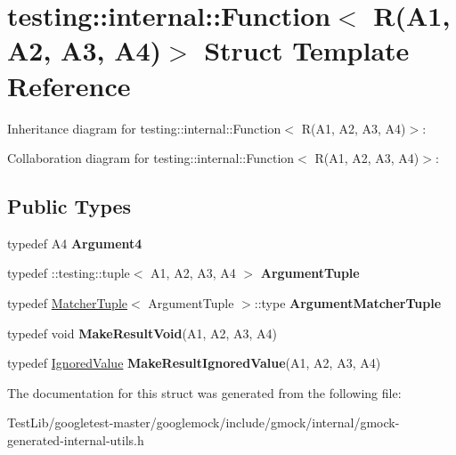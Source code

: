 \hypertarget{structtesting_1_1internal_1_1Function_3_01R_07A1_00_01A2_00_01A3_00_01A4_08_4}{}\section{testing\+:\+:internal\+:\+:Function$<$ R(A1, A2, A3, A4)$>$ Struct Template Reference}
\label{structtesting_1_1internal_1_1Function_3_01R_07A1_00_01A2_00_01A3_00_01A4_08_4}


Inheritance diagram for testing\+:\+:internal\+:\+:Function$<$ R(A1, A2, A3, A4)$>$\+:


Collaboration diagram for testing\+:\+:internal\+:\+:Function$<$ R(A1, A2, A3, A4)$>$\+:
\subsection*{Public Types}
\begin{DoxyCompactItemize}
\item 
\mbox{\label{structtesting_1_1internal_1_1Function_3_01R_07A1_00_01A2_00_01A3_00_01A4_08_4_ae5039423598ab0fecd4f594acbf34d85}} 
typedef A4 {\bfseries Argument4}
\item 
\mbox{\label{structtesting_1_1internal_1_1Function_3_01R_07A1_00_01A2_00_01A3_00_01A4_08_4_a8ad9e0ae57a766f80a9816ad45626812}} 
typedef \+::testing\+::tuple$<$ A1, A2, A3, A4 $>$ {\bfseries Argument\+Tuple}
\item 
\mbox{\label{structtesting_1_1internal_1_1Function_3_01R_07A1_00_01A2_00_01A3_00_01A4_08_4_a9524b18868ab632a90d4cb6917057a14}} 
typedef \hyperlink{structtesting_1_1internal_1_1MatcherTuple}{Matcher\+Tuple}$<$ Argument\+Tuple $>$\+::type {\bfseries Argument\+Matcher\+Tuple}
\item 
\mbox{\label{structtesting_1_1internal_1_1Function_3_01R_07A1_00_01A2_00_01A3_00_01A4_08_4_af7462da27e87a9d580e7f9748ebc5754}} 
typedef void {\bfseries Make\+Result\+Void}(A1, A2, A3, A4)
\item 
\mbox{\label{structtesting_1_1internal_1_1Function_3_01R_07A1_00_01A2_00_01A3_00_01A4_08_4_a6736086d1c8ba25788add1e5180207f9}} 
typedef \hyperlink{classtesting_1_1internal_1_1IgnoredValue}{Ignored\+Value} {\bfseries Make\+Result\+Ignored\+Value}(A1, A2, A3, A4)
\end{DoxyCompactItemize}


The documentation for this struct was generated from the following file\+:\begin{DoxyCompactItemize}
\item 
Test\+Lib/googletest-\/master/googlemock/include/gmock/internal/gmock-\/generated-\/internal-\/utils.\+h\end{DoxyCompactItemize}
